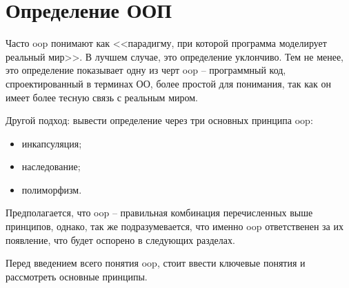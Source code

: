 \section{Определение ООП}\label{sec:history}

Часто \gls{oop} понимают как <<парадигму, при которой программа моделирует реальный мир>>. В лучшем случае, это определение уклончиво. Тем не менее, это определение показывает одну из черт \gls{oop} -- программный код, спроектированный в терминах ОО, более простой для понимания, так как он имеет более тесную связь с реальным миром.

Другой подход: вывести определение через три основных принципа \gls{oop}:
\begin{itemize}
	\item инкапсуляция;
	\item наследование;
	\item полиморфизм.
\end{itemize}

Предполагается, что \gls{oop} -- правильная комбинация перечисленных выше принципов, однако, так же подразумевается, что именно \gls{oop} ответственен за их появление, что будет оспорено в следующих разделах.

Перед введением всего понятия \gls{oop}, стоит ввести ключевые понятия и рассмотреть основные принципы.